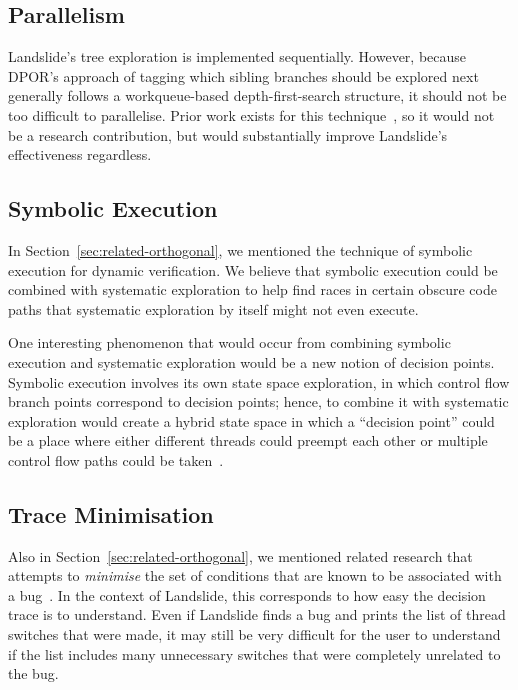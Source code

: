 \subsection{Parallelism}

Landslide's tree exploration is implemented sequentially. However, because DPOR's approach of tagging which sibling branches should be explored next generally follows a workqueue-based depth-first-search structure, it should not be too difficult to parallelise. Prior work exists for this technique~\cite{distributed-dpor}, so it would not be a research contribution, but would substantially improve Landslide's effectiveness regardless.

\subsection{Symbolic Execution}
\label{sec:future-dawson}

In Section~\ref{sec:related-orthogonal}, we mentioned the technique of symbolic execution for dynamic verification. We believe that symbolic execution could be combined with systematic exploration to help find races in certain obscure code paths that systematic exploration by itself might not even execute.

One interesting phenomenon that would occur from combining symbolic execution and systematic exploration would be a new notion of decision points. Symbolic execution involves its own state space exploration, in which control flow branch points correspond to decision points; hence, to combine it with systematic exploration would create a hybrid state space in which a ``decision point'' could be a place where either different threads could preempt each other or multiple control flow paths could be taken~\cite{dawson}.

\subsection{Trace Minimisation}
\label{sec:future-trace-minimisation}

Also in Section~\ref{sec:related-orthogonal}, we mentioned related research that attempts to {\em minimise} the set of conditions that are known to be associated with a bug~\cite{dag-mining}.
In the context of Landslide, this corresponds to how easy the decision trace is to understand. Even if Landslide finds a bug and prints the list of thread switches that were made, it may still be very difficult for the user to understand if the list includes many unnecessary switches that were completely unrelated to the bug.

